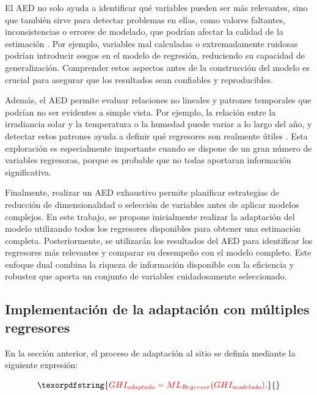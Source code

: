 \documentclass[letterpaper,12pt, twoside]{report}
\providecommand{\DIFdeltex}[1]{{\protect\color{red} \scriptsize #1}} %
\providecommand{\DIFdel}[1]{\texorpdfstring{\DIFdeltex{#1}}{}} %
\begin{document}
\DIFdel{El AED no solo ayuda a identificar qué variables pueden ser más relevantes, sino que también sirve para detectar problemas en ellas, como valores faltantes, inconsistencias o errores de modelado, que podrían afectar la calidad de la estimación \citep{Tukey1977, Behrens1997, Wilks2006}. Por ejemplo, variables mal calculadas o extremadamente ruidosas podrían introducir sesgos en el modelo de regresión, reduciendo su capacidad de generalización. Comprender estos aspectos antes de la construcción del modelo es crucial para asegurar que los resultados sean confiables y reproducibles.  
}%

\DIFdel{Además, el AED permite evaluar relaciones no lineales y patrones temporales que podrían no ser evidentes a simple vista. Por ejemplo, la relación entre la irradiancia solar y la temperatura o la humedad puede variar a lo largo del año, y detectar estos patrones ayuda a definir qué regresores son realmente útiles \citep{ Kuhn2013}. Esta exploración es especialmente importante cuando se dispone de un gran número de variables regresoras, porque es probable que no todas aportaran información significativa.  
}%

\DIFdel{Finalmente, realizar un AED exhaustivo permite planificar estrategias de reducción de dimensionalidad o selección de variables antes de aplicar modelos complejos. En este trabajo, se propone inicialmente realizar la adaptación del modelo utilizando todos los regresores disponibles para obtener una estimación completa. Posteriormente, se utilizarán los resultados del AED para identificar los regresores más relevantes y comparar su desempeño con el modelo completo. Este enfoque dual combina la riqueza de información disponible con la eficiencia y robustez que aporta un conjunto de variables cuidadosamente seleccionado.  
}%

\subsection{\DIFdel{Implementación de la adaptación con múltiples regresores}}
\addtocounter{subsection}{-1}%

\DIFdel{En la sección anterior, el proceso de adaptación al sitio se definía mediante la siguiente expresión:
}%

\begin{displaymath}
\DIFdel{GHI_{adaptado} = ML_{Regresor}(GHI_{modelado}),
}\end{displaymath}%
\end{document}
